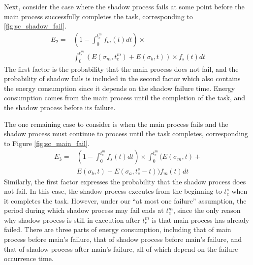 Next, consider the case where the shadow process fails at some point
before the main process successfully completes the task, corresponding to
\ref{fig:sc_shadow_fail}.
\begin{equation}
\begin{split}
E_2 = & (1-\int_0^{t_c^m}f_m(t)dt) \times \\
      & \int_0^{t_c^m}(E(\sigma_m,t_c^m)+E(\sigma_b,t)) \times f_s(t)dt
\label{eq:energy_shadow_fail}
\end{split}
\end{equation}
The first factor is the probability that the main process does not
fail, and the probability of shadow fails is included in the second factor which also contains the energy consumption since it depends on the shadow failure time. Energy consumption comes from the main process until the completion of the task,
and the shadow process before its failure.

The one remaining case to consider is when the main process fails and
the shadow process must continue to process until the task completes,
corresponding to Figure \ref{fig:sc_main_fail}.
\begin{equation}
\begin{split}
E_3 = & (1-\int_0^{t_c^m}f_s(t)dt) \times \int_0^{t_c^m}(E(\sigma_m,t)+\\
      & E(\sigma_b,t)+E(\sigma_a,t_c^s-t))f_m(t)dt
\label{eq:energy_main_fail}
\end{split}
\end{equation}
Similarly, the first factor expresses the probability that the shadow process does
not fail. In this case, the shadow process executes from the beginning to
$t_c^s$ when it completes the task. However, under our ``at most one
failure'' assumption, the period during which shadow process may fail
ends at $t_c^m$, since the only reason why shadow process is still in
execution after $t_c^m$ is that main process has already failed. There
are three parts of energy consumption, including that of main process
before main's failure, that of shadow process before main's failure,
and that of shadow process after main's failure, all of which depend
on the failure occurrence time. 

